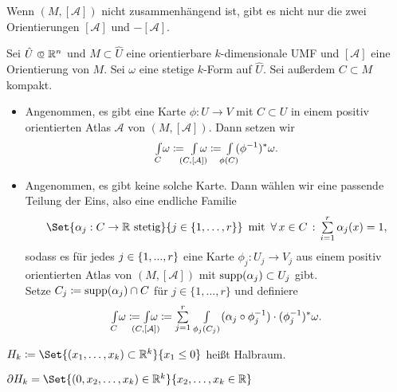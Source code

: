 \documentclass{cheat-sheet}
\newcommand{\Atlas}{\mathcal{A}} %
\theoremstyle{definition}
\newcommand{\Intdf}[2]{{\textstyle \int\limits_{#1}} #2} %
\begin{document}
\begin{bem}
  Wenn $(M, [\Atlas])$ nicht zusammenhängend ist, gibt es nicht nur die zwei Orientierungen $[\Atlas]$ und $-[\Atlas]$.
\end{bem}

\begin{defn}
  Sei $\hat{U} \opn \R^n$ und $M \subset \hat{U}$ eine orientierbare $k$-dimensionale UMF und $[\Atlas]$ eine Orientierung von $M$. Sei $\omega$ eine stetige $k$-Form auf $\hat{U}$. Sei außerdem $C \subset M$ kompakt.
  \begin{itemize}
    \item Angenommen, es gibt eine Karte $\phi : U \to V$ mit $C \subset U$ in einem positiv orientierten Atlas $\Atlas$ von $(M, [\Atlas])$. Dann setzen wir
    \[ \Intdf{C}{\omega} \coloneqq \,\, \Intdf{\mathclap{(C, [\Atlas])}}{\,\omega} \coloneqq \, \Intdf{\mathclap{\phi(C)}}{\, (\phi^{-1})^* \omega}. \]
    \item Angenommen, es gibt keine solche Karte. Dann wählen wir eine passende Teilung der Eins, also eine endliche Familie
    \[
      \Set{\alpha_j : C \to \R \text{ stetig}}{j \in \{ 1, \ldots, r \}}
      \enspace \text{mit} \enspace
      \fa{x \in C} \sum_{i=1}^r \alpha_j(x) = 1,
    \]
    sodass es für jedes $j \in \{ 1, ..., r \}$ eine Karte $\phi_j : U_j \to V_j$ aus einem positiv orientierten Atlas von $(M, [\Atlas])$ mit $\operatorname{supp}(\alpha_j) \subset U_j$ gibt.\\
    Setze $C_j \coloneqq \operatorname{supp}(\alpha_j) \cap C$ für $j \in \{ 1, \ldots, r \}$ und definiere
    \[
      \Intdf{C}{\omega} \coloneqq \Intdf{\mathclap{(C, [\Atlas])}}{\omega} \coloneqq \sum_{j=1}^r \Intdf{\,\phi_j(C_j)}{(\alpha_j \circ \phi_j^{-1}) \cdot (\phi_j^{-1})^* \omega}.
    \]
  \end{itemize}
\end{defn}



\begin{nota}
  $H_k \coloneqq \Set{ (x_1, \ldots, x_k) \subset \R^k }{ x_1 \leq 0 }$ heißt Halbraum.
\end{nota}

\begin{bem}
  $\partial H_k = \Set{ (0, x_2, \ldots, x_k) \in \R^k }{ x_2, \ldots, x_k \in \R }$
\end{bem}
\end{document}
